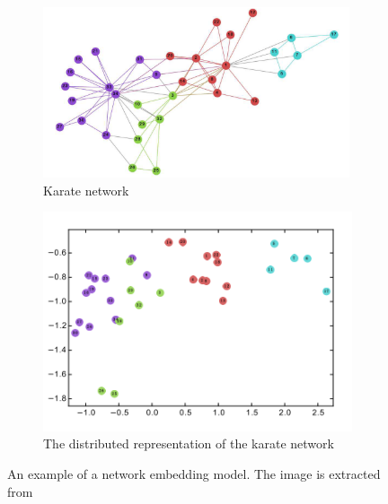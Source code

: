 \begin{figure}[t]

\begin{subfigure}[t]{.5\textwidth}
  \centering
  \includegraphics[width=\linewidth]{Figures/fig_karate_network.png}
  \caption{Karate network}
  \label{fig:karate_network}
\end{subfigure}%
\hspace{0.5cm}
\begin{subfigure}[t]{.5\textwidth}
  \includegraphics[width=\linewidth]{Figures/fig_karate_represtation.png}
  \caption{ The distributed representation of the karate network}
  \label{fig:karate_network_rep}
\end{subfigure}
 \caption{An example of a network embedding model. The image is extracted from~\protect\cite{DeepWalk}} 
  \label{fig:whole_karate_network_representation}
\end{figure}